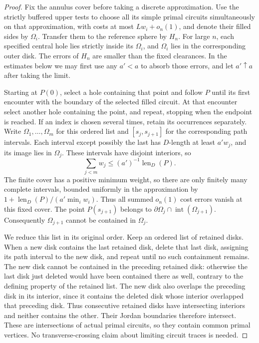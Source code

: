 \documentclass[11pt]{article}
\numberwithin{equation}{section}
\theoremstyle{definition}
\theoremstyle{remark}
\newcommand{\1}{\mathbf 1}
\begin{document}
\begin{proof}
Fix the annulus cover before taking a discrete approximation.  Use the
strictly buffered upper tests to choose all its simple primal circuits
simultaneously on that approximation, with costs at most $Lw_i+o_n(1)$,
and denote their filled sides by
$\Omega_i$.  Transfer them to the reference sphere by $H_n$.  For large
$n$, each specified central hole lies strictly inside its $\Omega_i$,
and $\Omega_i$ lies in the corresponding outer disk.  The errors of
$H_n$ are smaller than the fixed clearances.  In the estimates below we
may first use any $a'<a$ to absorb those errors, and let $a'\uparrow a$
after taking the limit.

Starting at $P(0)$, select a hole containing that point and follow $P$
until its first encounter with the boundary of the selected filled
circuit.  At that encounter select another hole containing the point,
and repeat, stopping when the endpoint is reached.  If an index is
chosen several times, retain its occurrences separately.  Write
$\Omega_1,\ldots,\Omega_m$ for this ordered list and $[s_j,s_{j+1}]$
for the corresponding path intervals.  Each interval except possibly
the last has $D$-length at least $a'w_j$, and its image lies in
$\Omega_j$.  These intervals have disjoint interiors, so
\[
 \sum_{j<m}w_j\le (a')^{-1}\operatorname{len}_D(P).
\]
The finite cover has a positive minimum weight, so there are only
finitely many complete intervals, bounded uniformly in the approximation
by $1+\operatorname{len}_D(P)/(a'\min_iw_i)$.  Thus all summed
$o_n(1)$ cost errors vanish at this fixed cover.  The point $P(s_{j+1})$ belongs to
$\partial\Omega_j\cap\operatorname{int}(\Omega_{j+1})$.  Consequently
$\Omega_{j+1}$ cannot be contained in $\Omega_j$.

We reduce this list in its original order.  Keep an ordered list of
retained disks.  When a new disk contains the last retained disk,
delete that last disk, assigning its path interval to the new disk,
and repeat until no such containment remains.  The new disk cannot
be contained in the preceding retained disk: otherwise the last disk
just deleted would have been contained there as well, contrary to
the defining property of the retained list.  The new disk also overlaps the preceding disk in its interior, since
it contains the deleted disk whose interior overlapped that preceding
disk.
Thus consecutive retained disks have intersecting interiors and
neither contains the other.  Their Jordan boundaries therefore
intersect.  These are intersections of actual primal circuits, so
they contain common primal vertices.  No transverse-crossing claim
about limiting circuit traces is needed.


\end{proof}
\end{document}
